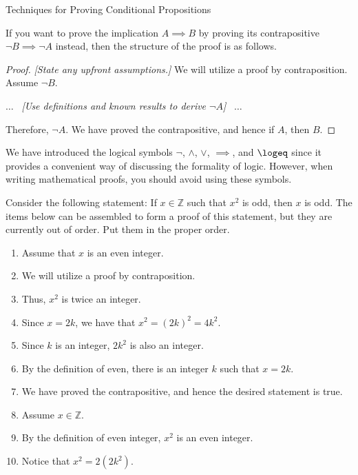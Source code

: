 \begin{section}{Techniques for Proving Conditional Propositions}
\begin{skeleton}\label{pf by contraposition}
If you want to prove the implication $A\implies B$ by proving its contrapositive $\neg B\implies \neg A$ instead, then the structure of the proof is as follows.

\begin{mdframed}[style=skeleton]
\begin{proof}
\emph{[State any upfront assumptions.]} We will utilize a proof by contraposition.  Assume $\neg B$.
\begin{center}
$\ldots$ \ \emph{[Use definitions and known results to derive $\neg A$]} \ $\ldots$\\
\end{center}
\noindent Therefore, $\neg A$. We have proved the contrapositive, and hence if $A$, then $B$.
\end{proof}
\end{mdframed}
\end{skeleton}

We have introduced the logical symbols $\neg$, $\wedge$, $\vee$, $\implies$, and $\logeq$  since it provides a convenient way of discussing the formality of logic.  However, when writing mathematical proofs, you should avoid using these symbols.

\begin{problem}
Consider the following statement: If $x\in\mathbb{Z}$ such that $x^2$ is odd, then $x$ is odd.
The items below can be assembled to form a proof of this statement, but they are currently out of order.  Put them in the proper order.
\begin{enumerate}
\item Assume that $x$ is an even integer.
\item We will utilize a proof by contraposition.
\item Thus, $x^2$ is twice an integer.
\item Since $x=2k$, we have that $x^2 =(2k)^2 =4k^2$.
\item Since $k$ is an integer, $2k^2$ is also an integer.
\item By the definition of even, there is an integer $k$ such that $x=2k$.
\item We have proved the contrapositive, and hence the desired statement is true.
\item Assume $x\in \mathbb{Z}$.
\item By the definition of even integer, $x^2$ is an even integer.
\item Notice that $x^2 = 2(2k^2)$.
\end{enumerate}
\end{problem}


\end{section}
